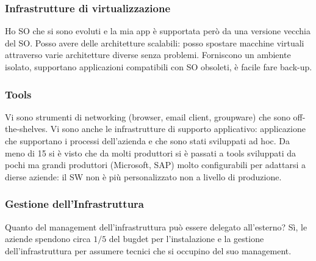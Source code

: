 \subsubsection{Infrastrutture di virtualizzazione}
\label{subs:Infrastrutture di virtualizzazione}
Ho SO che si sono evoluti e la mia app \`e supportata per\`o da una versione vecchia del SO.
Posso avere delle architetture scalabili: posso spostare macchine virtuali attraverso
varie architetture diverse senza problemi.
Forniscono un ambiente isolato, supportano applicazioni compatibili con SO obsoleti, \`e facile
fare back-up.



\subsubsection{Tools}
\label{subs:Tools}
Vi sono strumenti di networking (browser, email client, groupware) che sono off-the-shelves.
Vi sono anche le infrastrutture di supporto applicativo: applicazione che supportano i processi dell'azienda
e che sono stati sviluppati ad hoc.
Da meno di 15 si \`e visto che da molti produttori si \`e passati a tools sviluppati da pochi ma grandi produttori
(Microsoft, SAP) molto configurabili per adattarsi a dierse aziende: il SW non \`e pi\`u personalizzato
non a livello di produzione.

\subsubsection{Gestione dell'Infrastruttura}
\label{subs:Gestione dell'Infrastruttura}
Quanto del management dell'infrastruttura pu\`o essere delegato all'esterno?
S\`i, le aziende spendono circa $1/5$ del bugdet per l'instalazione e la gestione dell'infrastruttura
per assumere tecnici che si occupino del suo management.
